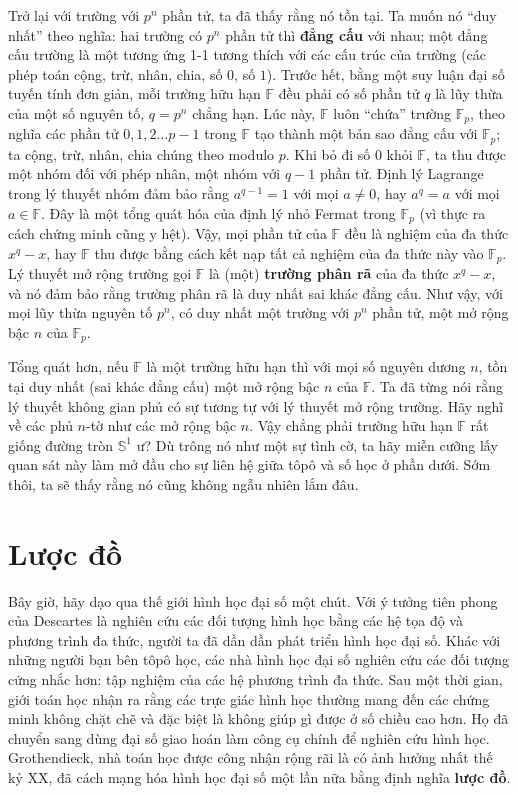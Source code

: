 \documentclass[12pt]{article}
\begin{document}
Trở lại với trường với $p^n$ phần tử, ta đã thấy rằng nó tồn tại. Ta muốn nó ``duy nhất'' theo nghĩa: hai trường có $p^n$ phần tử thì {\bf đẳng cấu} với nhau; một đẳng cấu trường là một tương ứng 1-1 tương thích với các cấu trúc của trường (các phép toán cộng, trừ, nhân, chia, số $0$, số $1$). Trước hết, bằng một suy luận đại số tuyến tính đơn giản, mỗi trường hữu hạn $\mathbb{F}$ đều phải có số phần tử $q$ là lũy thừa của một số nguyên tố, $q = p^n$ chẳng hạn. Lúc này, $\mathbb{F}$ luôn ``chứa'' trường $\mathbb{F}_p$, theo nghĩa các phần tử $0,1,2 \ldots p-1$ trong $\mathbb{F}$ tạo thành một bản sao đẳng cấu với $\mathbb{F}_p$; ta cộng, trừ, nhân, chia chúng theo modulo $p$. Khi bỏ đi số $0$ khỏi $\mathbb{F}$, ta thu được một nhóm đối với phép nhân, một nhóm với $q-1$ phần tử. Định lý Lagrange trong lý thuyết nhóm đảm bảo rằng $a^{q-1} = 1$ với mọi $a \neq 0$, hay $a^q = a$ với mọi $a \in \mathbb{F}$. Đây là một tổng quát hóa của định lý nhỏ Fermat trong $\mathbb{F}_p$ (vì thực ra cách chứng minh cũng y hệt). Vậy, mọi phần tử của $\mathbb{F}$ đều là nghiệm của đa thức $x^q - x$, hay $\mathbb{F}$ thu được bằng cách kết nạp tất cả nghiệm của đa thức này vào $\mathbb{F}_p$. Lý thuyết mở rộng trường gọi $\mathbb{F}$ là (một) {\bf trường phân rã} của đa thức $x^q - x$, và nó đảm bảo rằng trường phân rã là duy nhất sai khác đẳng cấu. Như vậy, với mọi lũy thừa nguyên tố $p^n$, có duy nhất một trường với $p^n$ phần tử, một mở rộng bậc $n$ của $\mathbb{F}_p$.

Tổng quát hơn, nếu $\mathbb{F}$ là một trường hữu hạn thì với mọi số nguyên dương $n$, tồn tại duy nhất (sai khác đẳng cấu) một mở rộng bậc $n$ của $\mathbb{F}$. Ta đã từng nói rằng lý thuyết không gian phủ có sự tương tự với lý thuyết mở rộng trường. Hãy nghĩ về các phủ $n$-tờ như các mở rộng bậc $n$. Vậy chẳng phải trường hữu hạn $\mathbb{F}$ rất giống đường tròn $\mathbb{S}^1$ ư? Dù trông nó như một sự tình cờ, ta hãy miễn cưỡng lấy quan sát này làm mở đầu cho sự liên hệ giữa tôpô và số học ở phần dưới. Sớm thôi, ta sẽ thấy rằng nó cũng không ngẫu nhiên lắm đâu.





\section{Lược đồ}

Bây giờ, hãy dạo qua thế giới hình học đại số một chút. Với ý tưởng tiên phong của Descartes là nghiên cứu các đối tượng hình học bằng các hệ tọa độ và phương trình đa thức, người ta đã dần dần phát triển hình học đại số. Khác với những người bạn bên tôpô học, các nhà hình học đại số nghiên cứu các đối tượng cứng nhắc hơn: tập nghiệm của các hệ phương trình đa thức. Sau một thời gian, giới toán học nhận ra rằng các trực giác hình học thường mang đến các chứng minh không chặt chẽ và đặc biệt là không giúp gì được ở số chiều cao hơn. Họ đã chuyển sang dùng đại số giao hoán làm công cụ chính để nghiên cứu hình học. Grothendieck, nhà toán học được công nhận rộng rãi là có ảnh hưởng nhất thế kỷ XX, đã cách mạng hóa hình học đại số một lần nữa bằng định nghĩa {\bf lược đồ}.
\end{document}
